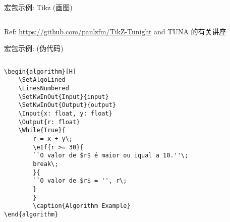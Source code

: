 \begin{frame}[fragile]{宏包示例: Tikz (画图)}
\begin{columns}
\begin{column}{.4\textwidth}
        
        \end{column}
        \end{columns}
    Ref: \url{https://github.com/paulzfm/TikZ-Tunight} and TUNA 的有关讲座
    
\end{frame}

\begin{frame}[fragile]{宏包示例:  (伪代码)}
    \begin{columns}
    \begin{column}{.6\textwidth}
        \lstset{language=[LaTeX]TeX}
    \begin{lstlisting}[basicstyle=\ttfamily\footnotesize]
\begin{algorithm}[H]
    \SetAlgoLined
    \LinesNumbered
    \SetKwInOut{Input}{input}
    \SetKwInOut{Output}{output}
    \Input{x: float, y: float}
    \Output{r: float}
    \While{True}{
        r = x + y\;
        \eIf{r >= 30}{
        ``O valor de $r$ é maior ou iqual a 10.''\;
        break\;
        }{
        ``O valor de $r$ = '', r\;
        }
        } 
        \caption{Algorithm Example}
\end{algorithm}
    \end{lstlisting}
    \end{column}
    \begin{column}{.4\textwidth}
        \begin{algorithm}[H]
            \SetAlgoLined
            \LinesNumbered
             \caption{Algorithm Example}
        \end{algorithm}
    \end{column}
    \end{columns}
\end{frame}